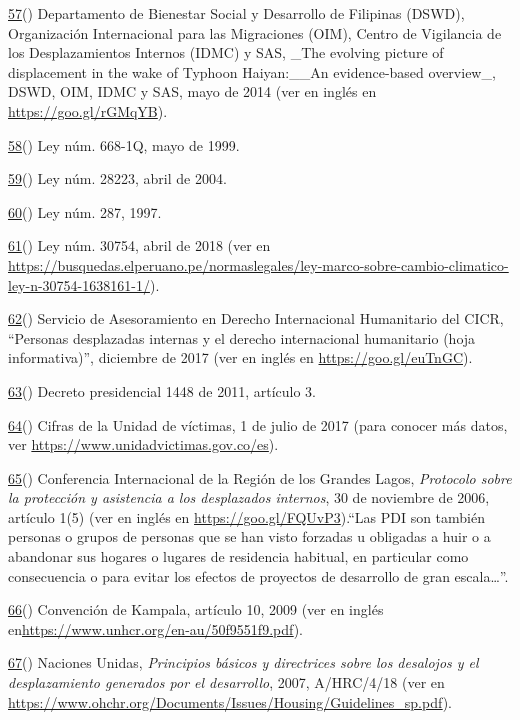 \documentclass[
]{book}
\begin{document}
\protect\hyperlink{sdfootnote57anc}{57}() Departamento de Bienestar Social y Desarrollo de Filipinas (DSWD), Organización Internacional para las Migraciones (OIM), Centro de Vigilancia de los Desplazamientos Internos (IDMC) y SAS, \_The evolving picture of displacement in the wake of Typhoon Haiyan:\_\_An evidence-based overview\_, DSWD, OIM, IDMC y SAS, mayo de 2014 (ver en inglés en \url{https://goo.gl/rGMqYB}).

\protect\hyperlink{sdfootnote58anc}{58}() Ley núm. 668-1Q, mayo de 1999.

\protect\hyperlink{sdfootnote59anc}{59}() Ley núm. 28223, abril de 2004.

\protect\hyperlink{sdfootnote60anc}{60}() Ley núm. 287, 1997.

\protect\hyperlink{sdfootnote61anc}{61}() Ley núm. 30754, abril de 2018 (ver en \url{https://busquedas.elperuano.pe/normaslegales/ley-marco-sobre-cambio-climatico-ley-n-30754-1638161-1/}).

\protect\hyperlink{sdfootnote62anc}{62}() Servicio de Asesoramiento en Derecho Internacional Humanitario del CICR, ``Personas desplazadas internas y el derecho internacional humanitario (hoja informativa)'', diciembre de 2017 (ver en inglés en \href{https://www.icrc.org/en/document/internally-displaced-persons-and-international-humanitarian-law-factsheet}{https://goo.gl/euTnGC}).

\protect\hyperlink{sdfootnote63anc}{63}() Decreto presidencial 1448 de 2011, artículo 3.

\protect\hyperlink{sdfootnote64anc}{64}() Cifras de la Unidad de víctimas, 1 de julio de 2017 (para conocer más datos, ver \url{https://www.unidadvictimas.gov.co/es}).

\protect\hyperlink{sdfootnote65anc}{65}() Conferencia Internacional de la Región de los Grandes Lagos, \emph{Protocolo sobre la protección y asistencia a los desplazados internos}, 30 de noviembre de 2006, artículo 1(5) (ver en inglés en \url{https://goo.gl/FQUvP3}).``Las PDI son también personas o grupos de personas que se han visto forzadas u obligadas a huir o a abandonar sus hogares o lugares de residencia habitual, en particular como consecuencia o para evitar los efectos de proyectos de desarrollo de gran escala\ldots{}''.

\protect\hyperlink{sdfootnote66anc}{66}() Convención de Kampala, artículo 10, 2009 (ver en inglés en\url{https://www.unhcr.org/en-au/50f9551f9.pdf}).

\protect\hyperlink{sdfootnote67anc}{67}() Naciones Unidas, \emph{Principios básicos y directrices sobre los desalojos y el desplazamiento generados por el desarrollo}, 2007, A/HRC/4/18 (ver en \url{https://www.ohchr.org/Documents/Issues/Housing/Guidelines_sp.pdf}).
\end{document}
